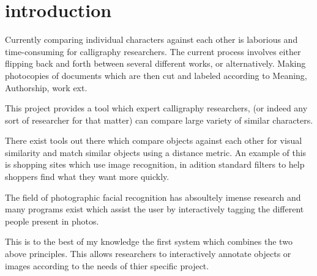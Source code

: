 \chapter{introduction}

Currently comparing individual characters against each other is laborious and time-consuming for calligraphy researchers.  The current process involves either flipping back and forth between several different works, or alternatively.  Making photocopies of documents which are then cut and labeled according to Meaning, Authorship, work ext.

This project provides a tool which expert calligraphy researchers, (or indeed any sort of researcher for that matter) can compare large variety of similar characters.

There exist tools out there which compare objects against each other for visual similarity and match similar objects using a distance metric.  An example of this is shopping sites which use image recognition, in adition standard filters to help shoppers find what they want more quickly.

The field of photographic facial recognition has absoultely imense research and many programs exist which assist the user by interactively tagging the different people present in photos.

This is to the best of my knowledge the first system which combines the two above principles.  This allows researchers to interactively annotate objects or images according to the needs of thier specific project.
